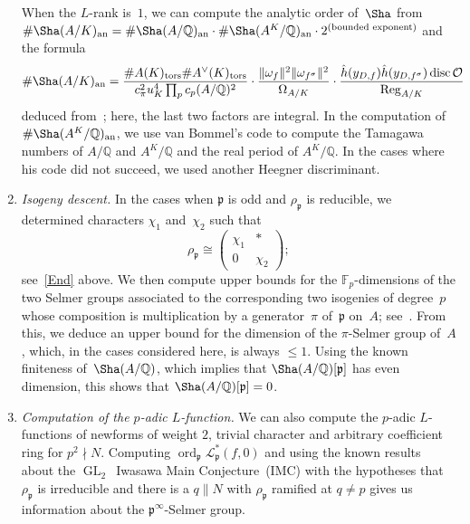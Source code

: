 \documentclass{amsart}
\newcommand{\Q}{{\mathbb{Q}}}
\newcommand{\F}{{\mathbb{F}}}
\newcommand{\pfr}{{\mathfrak{p}}}
\newcommand{\GL}{\operatorname{GL}}
\newcommand{\Ocal}{{\mathcal{O}}}
\newcommand{\disc}{\operatorname{disc}}
\newcommand{\an}{{\mathrm{an}}}
\newcommand{\tors}{{\mathrm{tors}}}
\newcommand{\Reg}{\operatorname{Reg}}
\newcommand{\ord}{\operatorname{ord}}
\newcommand{\isom}{\cong}
\begin{document}
\begin{enumerate}
		When the $L$-rank is~$1$, we can compute the analytic order of~$\Sha$ from $\#\Sha(A/K)_\an = \#\Sha(A/\Q)_\an \cdot \#\Sha(A^K/\Q)_\an \cdot 2^\text{(bounded exponent)}$ and the
		formula
		\begin{align*}
			\#\Sha(A/K)_\an 
			&=	\frac{\#A(K)_\tors \#A^\vee(K)_\tors}{c_\pi^2 u_K^4 \prod_p c_p(A/\Q)^2}
			\cdot \frac{\|\omega_f\|^2 \|\omega_{f^\sigma}\|^2}{\Omega_{A/K}}
			\cdot \frac{\hat{h}(y_{D,f}) \hat{h}(y_{D,f^\sigma})\disc\Ocal}{\Reg_{A/K}}
		\end{align*}
		deduced from~\cite{GrossZagier1986}; here, the last two factors are integral.
		In the computation of $\#\Sha(A^K/\Q)_\an$, we use van Bommel's code to compute the
		Tamagawa numbers of $A/\Q$ and $A^K/\Q$ and the real period of $A^K/\Q$. In the cases where
		his code did not succeed, we used another Heegner discriminant.
		
		\item \label{Sel}
		\emph{Isogeny descent.}
		In the cases when $\pfr$ is odd and $\rho_\pfr$ is reducible, we determined
		characters $\chi_1$ and~$\chi_2$ such that
		\[ \rho_\pfr \isom \begin{pmatrix} \chi_1 & * \\ 0 & \chi_2 \end{pmatrix} ; \]
		see~\eqref{End} above. We then compute upper bounds for the $\F_p$-dimensions
		of the two Selmer groups associated to the corresponding two isogenies of
		degree~$p$ whose composition is multiplication by a generator~$\pi$ of~$\pfr$ on~$A$;
		see~\cite{SchaeferStoll2004}.
		From this, we deduce an upper bound for the dimension of the $\pi$-Selmer
		group of~$A$, which, in the cases considered here, is always $\le
		1$.
		Using the known finiteness of~$\Sha(A/\Q)$, which implies that $\Sha(A/\Q)[\pfr]$
		has even dimension, this shows that $\Sha(A/\Q)[\pfr] = 0$.
		
		\item \label{p-adic}
		\emph{Computation of the $p$-adic $L$-function.}
		We can also compute the $p$-adic $L$-functions of newforms of weight $2$,
		trivial character and arbitrary coefficient ring for $p^2 \nmid N$.
		Computing $\ord_\pfr\mathcal{L}_\pfr^*(f,0)$ and using the known
		results~\cite{SkinnerUrban2014,Skinner2016} about the $\GL_2$~Iwasawa Main Conjecture~(IMC) with the hypotheses that
		$\rho_\pfr$ is irreducible and there is a $q \| N$ with $\rho_\pfr$ ramified
		at $q \neq p$ gives us information about the $\pfr^\infty$-Selmer group.
	\end{enumerate}
	
\end{document}
